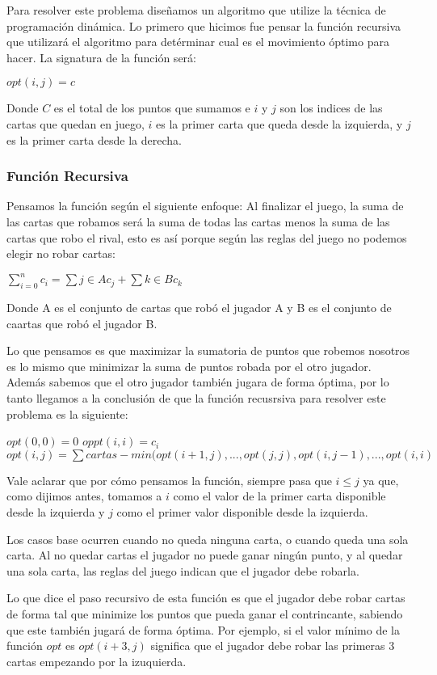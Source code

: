 Para resolver este problema diseñamos un algoritmo que utilize la técnica de programación dinámica. Lo primero que hicimos fue pensar la función recursiva que utilizará el algoritmo para detérminar cual es el movimiento óptimo para hacer. La signatura de la función será:

$opt(i,j) = c$

Donde $C$ es el total de los puntos que sumamos e $i$ y $j$ son los indices de las cartas que quedan en juego, $i$ es la primer carta que queda desde la izquierda, y $j$ es la primer carta desde la derecha.

\subsubsection{Función Recursiva}

Pensamos la función según el siguiente enfoque: Al finalizar el juego, la suma de las cartas que robamos será la suma de todas las cartas menos la suma de las cartas que robo el rival, esto es así porque según las reglas del juego no podemos elegir no robar cartas:

$\sum_{i=0}^{n} c_i = \sum{j \in A} c_j + \sum{k \in B} c_k$

Donde A es el conjunto de cartas que robó el jugador A y B es el conjunto de caartas que robó el jugador B.

Lo que pensamos es que maximizar la sumatoria de puntos que robemos nosotros es lo mismo que minimizar la suma de puntos robada por el otro jugador. Además sabemos que el otro jugador también jugara de forma óptima, por lo tanto llegamos a la conclusión de que la función recusrsiva para resolver este problema es la siguiente:

$opt(0,0) = 0$
$oppt(i,i) = c_i$
$opt(i,j) = \sum cartas - min(opt(i+1, j), ..., opt(j,j), opt(i, j-1), ... ,opt(i,i)$

Vale aclarar que por cómo pensamos la función, siempre pasa que $i \leq j$ ya que, como dijimos antes, tomamos a $i$ como el valor de la primer carta disponible desde la izquierda y $j$ como el primer valor disponible desde la izquierda.

Los casos base ocurren cuando no queda ninguna carta, o cuando queda una sola carta. Al no quedar cartas el jugador no puede ganar ningún punto, y al quedar una sola carta, las reglas del juego indican que el jugador debe robarla.

Lo que dice el paso recursivo de esta función es que el jugador debe robar cartas de forma tal que minimize los puntos que pueda ganar el contrincante, sabiendo que este también jugará de forma óptima. Por ejemplo, si el valor mínimo de la función $opt$ es $opt(i+3,j)$ significa que el jugador debe robar las primeras 3 cartas empezando por la izuquierda.

